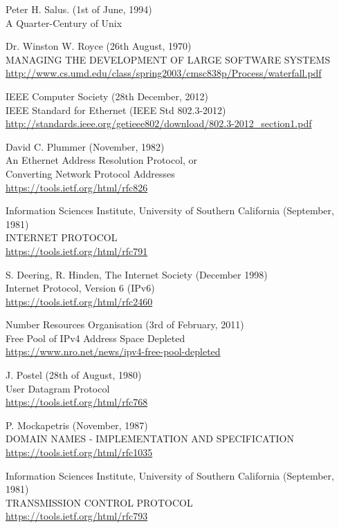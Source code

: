 \documentclass[10pt,a4paper,notitlepage]{report}
\begin{document}
\begin{thebibliography}{99}
    Peter H. Salus. (1st of June, 1994)\\
    A Quarter-Century of Unix

    Dr. Winston W. Royce (26th August, 1970)\\
    MANAGING THE DEVELOPMENT OF LARGE SOFTWARE SYSTEMS\\
    \url{http://www.cs.umd.edu/class/spring2003/cmsc838p/Process/waterfall.pdf}
    
	IEEE Computer Society (28th December, 2012)\\
	IEEE Standard for Ethernet (IEEE Std 802.3-2012)\\
	\url{http://standards.ieee.org/getieee802/download/802.3-2012_section1.pdf}
	
	David C. Plummer (November, 1982)\\
	An Ethernet Address Resolution Protocol, or\\
	Converting Network Protocol Addresses\\
	\url{https://tools.ietf.org/html/rfc826}
	
	Information Sciences Institute, University of Southern California (September, 1981)\\
	INTERNET PROTOCOL\\
	\url{https://tools.ietf.org/html/rfc791}
	
	S. Deering, R. Hinden, The Internet Society (December 1998)\\
	Internet Protocol, Version 6 (IPv6)\\
	\url{https://tools.ietf.org/html/rfc2460}

	Number Resources Organisation (3rd of February, 2011)\\
	Free Pool of IPv4 Address Space Depleted\\
	\url{https://www.nro.net/news/ipv4-free-pool-depleted}

	J. Postel (28th of August, 1980)\\
	User Datagram Protocol\\
	\url{https://tools.ietf.org/html/rfc768}

	P. Mockapetris (November, 1987)\\
	DOMAIN NAMES - IMPLEMENTATION AND SPECIFICATION\\
	\url{https://tools.ietf.org/html/rfc1035}

	Information Sciences Institute, University of Southern California (September, 1981)\\
	TRANSMISSION CONTROL PROTOCOL\\
	\url{https://tools.ietf.org/html/rfc793}


\end{thebibliography}
\end{document}
